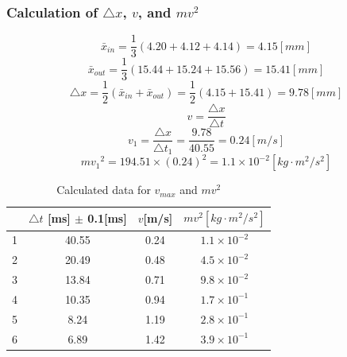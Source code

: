 \documentclass[12pt]{article}
\begin{document}
\subsubsection{Calculation of $\bigtriangleup{x}$, $v$, and $mv^2$}
$$\bar{x}_{in}=\frac{1}{3}(4.20+4.12+4.14)=4.15[mm]$$
$$\bar{x}_{out}=\frac{1}{3}(15.44+15.24+15.56)=15.41[mm]$$
$$\bigtriangleup{x}=\frac{1}{2}(\bar{x}_{in}+\bar{x}_{out})=\frac{1}{2}(4.15+15.41)=9.78[mm]$$
$$v=\frac{\bigtriangleup{x}}{\bigtriangleup{t}}$$
$$v_1=\frac{\bigtriangleup{x}}{\bigtriangleup{t}_1}=\frac{9.78}{40.55}=0.24[m/s]$$
$$m{v_1}^2=194.51\times(0.24)^2=1.1\times{10^{-2}}[kg\cdot{m^2}/{s^2}]$$
\begin{table}[H]
\centering
\begin{tabular}{|c|c|c|c|}
\hline
  & $\bigtriangleup{t}$ {[}ms{]} $\pm$ 0.1{[}ms{]}& $v$[m/s]&$mv^2[kg\cdot{m^2}/{s^2}]$  \\ \hline
1 & 40.55 & 0.24 & $1.1\times{10^{-2}}$ \\ \hline
2 & 20.49 & 0.48 &$4.5\times{10^{-2}}$\\ \hline
3 & 13.84 & 0.71 &$9.8\times{10^{-2}}$\\ \hline
4 & 10.35 & 0.94 &$1.7\times{10^{-1}}$\\ \hline
5 & 8.24  & 1.19 &$2.8\times{10^{-1}}$\\ \hline
6 & 6.89  & 1.42 &$3.9\times{10^{-1}}$\\ \hline
\end{tabular}
\caption{Calculated data for $v_{max}$ and $mv^2$}
\end{table}
\end{document}
